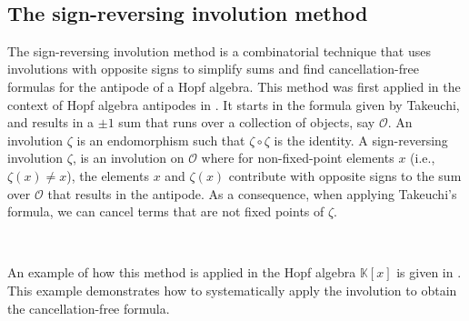 \documentclass[12pt, reqno]{amsart}
\theoremstyle{definition}
\begin{document}
\

\subsection{The sign-reversing involution method}

The sign-reversing involution method is a combinatorial technique that uses involutions with opposite signs to simplify sums and find cancellation-free formulas for the antipode of a Hopf algebra. This method was first applied in the context of Hopf algebra antipodes in \cite{BS2017}.
It starts in the formula given by Takeuchi, and results in a $\pm1$ sum that runs over a collection of objects, say $\mathcal O$.
An involution $\zeta $ is an endomorphism such that $\zeta \circ \zeta$ is the identity.
A sign-reversing involution $\zeta $, is an involution on $\mathcal O$ where for non-fixed-point elements $x$ (i.e., $\zeta(x) \neq x$), the elements $x$ and $\zeta(x)$ contribute with opposite signs to the sum over $\mathcal O$ that results in the antipode.
As a consequence, when applying Takeuchi's formula, we can cancel terms that are not fixed points of $\zeta$.


%

\


An example of how this method is applied in the Hopf algebra $\mathbb{K}[x]$ is given in \cite{BS2017}. This example demonstrates how to systematically apply the involution to obtain the cancellation-free formula.
\end{document}
